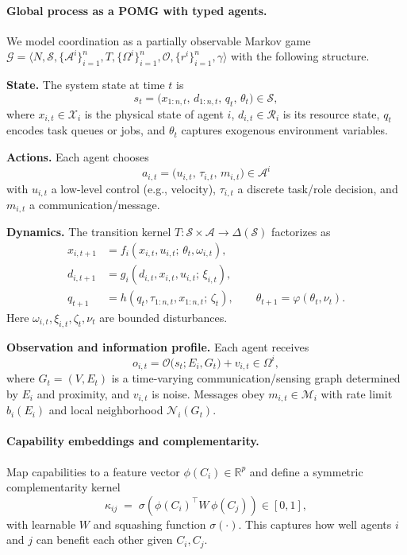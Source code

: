\paragraph{Global process as a POMG with typed agents.}
We model coordination as a partially observable Markov game
$\mathcal{G}=\langle N,\mathcal{S},\{\mathcal{A}^i\}_{i=1}^n,T,
\{\Omega^i\}_{i=1}^n,\mathcal{O},\{r^i\}_{i=1}^n,\gamma\rangle$ with the following structure.

\textbf{State.}
The system state at time $t$ is
\[
s_t=\big(x_{1:n,t},\, d_{1:n,t},\, q_t,\, \theta_t\big)\in\mathcal{S},
\]
where $x_{i,t}\in\mathcal{X}_i$ is the physical state of agent $i$,
$d_{i,t}\in\mathcal{R}_i$ is its resource state, $q_t$ encodes task queues or jobs,
and $\theta_t$ captures exogenous environment variables.

\textbf{Actions.}
Each agent chooses
\[
a_{i,t}=\big(u_{i,t},\, \tau_{i,t},\, m_{i,t}\big)\in\mathcal{A}^i
\]
with $u_{i,t}$ a low-level control (e.g., velocity), $\tau_{i,t}$ a discrete task/role decision,
and $m_{i,t}$ a communication/message.

\textbf{Dynamics.}
The transition kernel $T:\mathcal{S}\times\mathcal{A}\to\Delta(\mathcal{S})$
factorizes as
\[
\begin{aligned}
x_{i,t+1} &= f_i(x_{i,t},u_{i,t};\,\theta_t,\omega_{i,t}), \\
d_{i,t+1} &= g_i(d_{i,t},x_{i,t},u_{i,t};\,\xi_{i,t}), \\
q_{t+1} &= h(q_t,\tau_{1:n,t},x_{1:n,t};\,\zeta_t),\qquad
\theta_{t+1} = \varphi(\theta_t,\nu_t).
\end{aligned}
\]
Here $\omega_{i,t},\xi_{i,t},\zeta_t,\nu_t$ are bounded disturbances.

\textbf{Observation and information profile.}
Each agent receives
\[
o_{i,t} = \mathcal{O}\big(s_t;E_i,G_t\big) + v_{i,t}\in\Omega^i,
\]
where $G_t=(V,E_t)$ is a time-varying communication/sensing graph determined by $E_i$ and proximity,
and $v_{i,t}$ is noise. Messages obey $m_{i,t}\in\mathcal{M}_i$ with rate limit
$b_i(E_i)$ and local neighborhood $\mathcal{N}_i(G_t)$.

\paragraph{Capability embeddings and complementarity.}
Map capabilities to a feature vector $\phi(C_i)\in\mathbb{R}^p$ and define
a symmetric complementarity kernel
\[
\kappa_{ij} \;=\; \sigma\!\left(\phi(C_i)^\top W\,\phi(C_j)\right)\in[0,1],
\]
with learnable $W$ and squashing function $\sigma(\cdot)$.
This captures how well agents $i$ and $j$ can benefit each other given $C_i,C_j$.

